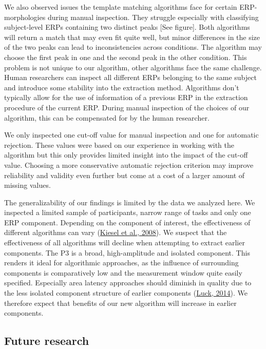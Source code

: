 \documentclass[
  man]{apa7}
\begin{document}
We also observed issues the template matching algorithms face for certain ERP-morphologies during manual inspection. They struggle especially with classifying subject-level ERPs containing two distinct peaks {[}See figure{]}. Both algorithms will return a match that may even fit quite well, but minor differences in the size of the two peaks can lead to inconsistencies across conditions. The algorithm may choose the first peak in one and the second peak in the other condition. This problem is not unique to our algorithm, other algorithms face the same challenge. Human researchers can inspect all different ERPs belonging to the same subject and introduce some stability into the extraction method. Algorithms don't typically allow for the use of information of a previous ERP in the extraction procedure of the current ERP. During manual inspection of the choices of our algorithm, this can be compensated for by the human researcher.

We only inspected one cut-off value for manual inspection and one for automatic rejection. These values were based on our experience in working with the algorithm but this only provides limited insight into the impact of the cut-off value. Choosing a more conservative automatic rejection criterion may improve reliability and validity even further but come at a cost of a larger amount of missing values.

The generalizability of our findings is limited by the data we analyzed here. We inspected a limited sample of participants, narrow range of tasks and only one ERP component. Depending on the component of interest, the effectiveness of different algorithms can vary (\protect\hyperlink{ref-kiesel2008measurement}{Kiesel et al., 2008}). We suspect that the effectiveness of all algorithms will decline when attempting to extract earlier components. The P3 is a broad, high-amplitude and isolated component. This renders it ideal for algorithmic approaches, as the influence of surrounding components is comparatively low and the measurement window quite easily specified. Especially area latency approaches should diminish in quality due to the less isolated component structure of earlier components (\protect\hyperlink{ref-luck2014introduction}{Luck, 2014}). We therefore expect that benefits of our new algorithm will increase in earlier components.

\hypertarget{future-research}{%
\subsection{Future research}\label{future-research}}
\end{document}
